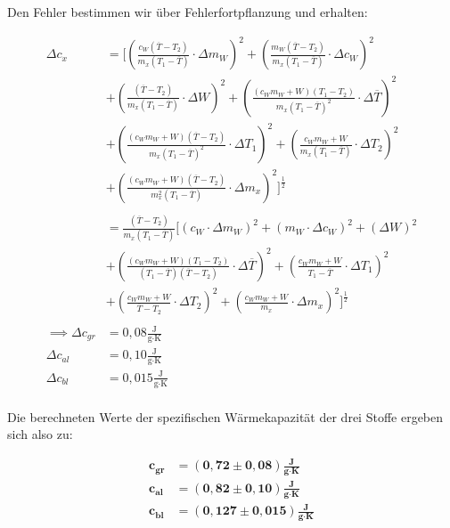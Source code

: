 \documentclass{article}
\begin{document}
Den Fehler bestimmen wir über Fehlerfortpflanzung und erhalten:

\begin{equation}
    \begin{split}
        \Delta c_x &= \Biggl[ \left( \frac{c_W (\overline{T} - T_2)}{m_x (T_1 - \overline{T})} \cdot \Delta m_W \right)^2 + \left( \frac{m_W (\overline{T} - T_2)}{m_x (T_1 - \overline{T})} \cdot \Delta c_W \right)^2 \\
        & + \left( \frac{(\overline{T} - T_2)}{m_x (T_1 - \overline{T})} \cdot \Delta W \right)^2 + \left( \frac{(c_W m_W + W) (T_1 - T_2)}{m_x (T_1 - \overline{T})^2} \cdot \Delta \overline{T} \right)^2 \\
        & + \left( \frac{(c_W m_W + W) (\overline{T} - T_2)}{m_x (T_1 - \overline{T})^2} \cdot \Delta T_1 \right)^2 + \left( \frac{c_W m_W + W}{m_x (T_1 - \overline{T})} \cdot \Delta T_2 \right)^2 \\
        & + \left( \frac{(c_W m_W + W) (\overline{T} - T_2)}{m_x^2 (T_1 - \overline{T})} \cdot \Delta m_x \right)^2 \Biggr] ^{\frac{1}{2}} \\ \\
        &= \frac{(\overline{T} - T_2)}{m_x (T_1 - \overline{T})} 
        \Biggl[ \left( c_W \cdot \Delta m_W \right)^2 + \left( m_W \cdot \Delta c_W \right)^2 + \left( \Delta W \right)^2 \\
        & + \left( \frac{(c_W m_W + W)(T_1-T_2)}{(T_1 - \overline{T})(\overline{T} - T_2)} \cdot \Delta \overline{T} \right)^2 + \left( \frac{c_W m_W + W}{T_1 - \overline{T}} \cdot \Delta T_1 \right)^2 \\
        & + \left( \frac{c_W m_W + W}{\overline{T} - T_2} \cdot \Delta T_2 \right)^2 + \left( \frac{c_W m_W + W}{m_x} \cdot \Delta m_x \right)^2 \Biggr]^{\frac{1}{2}} \\ \\
        \implies \Delta c_{gr} &= 0,08 \frac{\text{J}}{\text{g} \cdot \text{K}} \\
        \Delta c_{al} &= 0,10 \frac{\text{J}}{\text{g} \cdot \text{K}} \\
        \Delta c_{bl} &= 0,015 \frac{\text{J}}{\text{g} \cdot \text{K}} \\
    \end{split}
\end{equation}

\newpage
Die berechneten Werte der spezifischen Wärmekapazität der drei Stoffe ergeben sich also zu:

\begin{equation}
    \begin{split}
        \bm{c_{gr}} &= \bm{(0,72 \pm 0,08)} \frac{\textbf{J}}{\textbf{g} \cdot \textbf{K}} \\
        \bm{c_{al}} &= \bm{(0,82 \pm 0,10)} \frac{\textbf{J}}{\textbf{g} \cdot \textbf{K}} \\
        \bm{c_{bl}} &= \bm{(0,127 \pm 0,015)} \frac{\textbf{J}}{\textbf{g} \cdot \textbf{K}} \\
    \end{split}
\end{equation}
\end{document}
